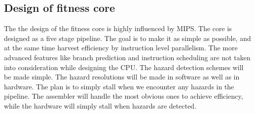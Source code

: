 \subsection{Design of fitness core}

The the design of the fitness core is highly influenced by MIPS.
The core is designed as a five stage pipeline.
The goal is to make it as simple as possible, and at the same time harvest efficiency by instruction level parallelism.
The more advanced features like branch prediction and instruction scheduling are not taken into consideration while designing the CPU.
The hazard detection schemes will be made simple.
The hazard resolutions will be made in software as well as in hardware.
The plan is to simply stall when we encounter any hazards in the pipeline.
The assembler will handle the most obvious ones to achieve efficiency, while the hardware will simply stall when hazards are detected.


